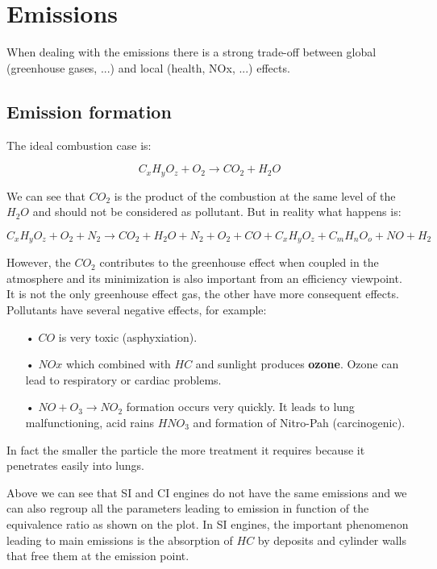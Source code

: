 
\chapter{Emissions}
	When dealing with the emissions there is a strong trade-off between global (greenhouse gases, ...) and local (health, NOx, ...) effects.
	
\section{Emission formation}
	The ideal combustion case is: 
	
	\begin{equation}
	C_x H_yO_z + O_2 \rightarrow CO_2 + H_2O
	\end{equation}
	
	We can see that $CO_2$ is the product of the combustion at the same level of the $H_2O$ and should not be considered as pollutant. But in reality what happens is: 
	
	\begin{equation}
	C_x H_y O_z + O_2 + N_2 \rightarrow CO_2 + H_2O + N_2 + O_2 + CO + C_xH_yO_z + C_mH_nO_o + NO + H_2
	\end{equation}
	
	However, the $CO_2$ contributes to the greenhouse effect when coupled in the atmosphere and its minimization is also important from an efficiency viewpoint. It is not the only greenhouse effect gas, the other have more consequent effects. \\
	
	Pollutants have several negative effects, for example: 
	\begin{itemize}	
	\item[•] $CO$ is very toxic (asphyxiation).
	\item[•] $NOx$ which combined with $HC$ and sunlight produces \textbf{ozone}. Ozone can lead to respiratory or cardiac problems. 
	\item[•] $NO + O_3 \rightarrow NO_2$ formation occurs very quickly. It leads to lung malfunctioning, acid rains $HNO_3$ and formation of Nitro-Pah (carcinogenic).\\
	\end{itemize}
	
	In fact the smaller the particle the more treatment it requires because it penetrates easily into lungs. 
	
	
	Above we can see that SI and CI engines do not have the same emissions and we can also regroup all the parameters leading to emission in function of the equivalence ratio as shown on the plot. In SI engines, the important phenomenon leading to main emissions is the absorption of $HC$ by deposits and cylinder walls that free them at the emission point. 
	
